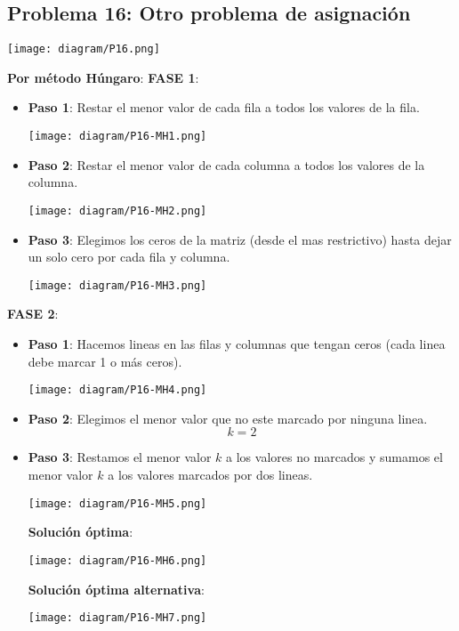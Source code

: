\documentclass{templateNote}
\begin{document}
\subsection*{Problema 16: Otro problema de asignación}
\begin{center}
    \texttt{[image: diagram/P16.png]}
\end{center}
\textbf{Por método Húngaro}:
\textbf{FASE 1}:
\begin{itemize}
    \item \textbf{Paso 1}: Restar el menor valor de cada fila a todos los valores de la fila.
    \begin{center}
        \texttt{[image: diagram/P16-MH1.png]}
    \end{center}
    
    \item \textbf{Paso 2}: Restar el menor valor de cada columna a todos los valores de la columna.
    \begin{center}
        \texttt{[image: diagram/P16-MH2.png]}
    \end{center}
    
    \item \textbf{Paso 3}: Elegimos los ceros de la matriz (desde el mas restrictivo) hasta dejar un solo cero por cada fila y columna.
    \begin{center}
        \texttt{[image: diagram/P16-MH3.png]}
    \end{center}
\end{itemize}

\textbf{FASE 2}:
\begin{itemize}
    \item \textbf{Paso 1}: Hacemos lineas en las filas y columnas que tengan ceros (cada linea debe marcar 1 o más ceros).
    \begin{center}
        \texttt{[image: diagram/P16-MH4.png]}
    \end{center}
    
    \item \textbf{Paso 2}: Elegimos el menor valor que no este marcado por ninguna linea.
    \begin{equation*}
        k = 2
    \end{equation*}

    \item \textbf{Paso 3}: Restamos el menor valor $k$ a los valores no marcados y sumamos el menor valor $k$ a los valores marcados por dos lineas.
    \begin{center}
        \texttt{[image: diagram/P16-MH5.png]}
    \end{center}
    
    \textbf{Solución óptima}:
    \begin{center}
        \texttt{[image: diagram/P16-MH6.png]}
    \end{center}

    \textbf{Solución óptima alternativa}:
    \begin{center}
        \texttt{[image: diagram/P16-MH7.png]}
    \end{center}
\end{itemize}
\end{document}
